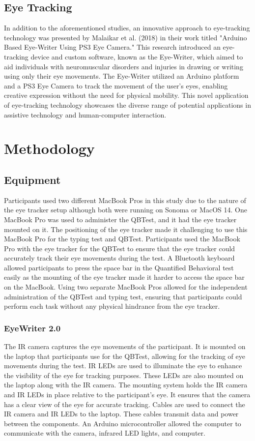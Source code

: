 \documentclass[manuscript, screen, review]{acmart} %
\begin{document}
\subsection{Eye Tracking}
In addition to the aforementioned studies, an innovative approach to eye-tracking technology was presented by \cite{Malaikar2018Arduino}Malaikar et al. (2018) in their work titled "Arduino Based Eye-Writer Using PS3 Eye Camera." This research introduced an eye-tracking device and custom software, known as the Eye-Writer, which aimed to aid individuals with neuromuscular disorders and injuries in drawing or writing using only their eye movements. The Eye-Writer utilized an Arduino platform and a PS3 Eye Camera to track the movement of the user's eyes, enabling creative expression without the need for physical mobility. This novel application of eye-tracking technology showcases the diverse range of potential applications in assistive technology and human-computer interaction.

\section{Methodology}
\subsection[short]{Equipment} 
Participants used two different MacBook Pros in this study due to the nature of the eye tracker setup although both were running on Sonoma or MacOS 14. One MacBook Pro was used to administer the QBTest, and it had the eye tracker mounted on it. The positioning of the eye tracker made it challenging to use this MacBook Pro for the typing test and QBTest. 
Participants used the MacBook Pro with the eye tracker for the QBTest to ensure that the eye tracker could accurately track their eye movements during the test. 
A Bluetooth keyboard allowed participants to press the space bar in the Quantified Behavioral test easily as the mounting of the eye tracker made it harder to access
the space bar on the MacBook.
Using two separate MacBook Pros allowed for the independent administration of the QBTest and typing test, ensuring that participants could perform each task without any physical hindrance from the eye tracker.

\subsubsection{EyeWriter 2.0}
The IR camera captures the eye movements of the participant.
It is mounted on the laptop that participants use for the QBTest, allowing for the tracking of eye movements during the test.
IR LEDs are used to illuminate the eye to enhance the visibility of the eye for tracking purposes. 
These LEDs are also mounted on the laptop along with the IR camera. 
The mounting system holds the IR camera and IR LEDs in place relative to the participant's eye. 
It ensures that the camera has a clear view of the eye for accurate tracking. 
Cables are used to connect the IR camera and IR LEDs to the laptop. These cables transmit data and power between the components.
An Arduino microcontroller allowed the computer to communicate with the camera, infrared LED lights, and computer.
\end{document}
